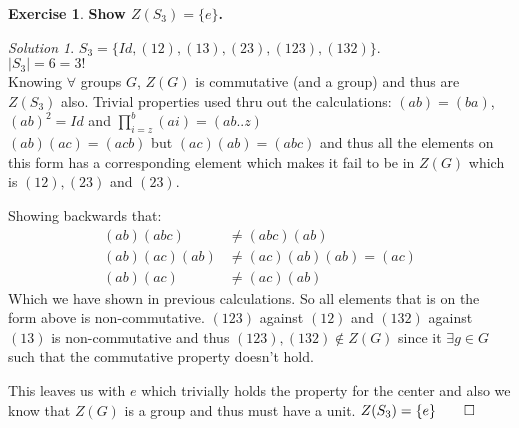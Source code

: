 \documentclass[a4paper,twoside=false,abstract=false,numbers=noenddot,
titlepage=false,headings=small,parskip=half,version=last]{scrartcl}
\theoremstyle{definition}
\newtheorem{exercise}{Exercise}
\theoremstyle{remark}
\newtheorem*{solution}{Solution}
\begin{document}
\begin{exercise}
{\bf
Show $Z(S_3)=\{e\}$.
}
\end{exercise}
\begin{solution}
$S_3=\{Id,(1 2),(1 3),(2 3),(1 2 3),(1 3 2)\}$. \\
$|S_3|=6=3!$\\

Knowing $\forall$ groups $G$, $Z(G)$ is commutative (and a group) and thus are $Z(S_3)$ also.
Trivial properties used thru out the calculations: $(a b)=(b a)$,$(a b)^2=Id$ and $\prod_{i=z}^b (a i)=(a b .. z)$ \\

$(a b)(a c)=(a c b)$ but $(a c)(a b)=(a b c)$ 
and thus all the elements on this form has a corresponding element 
which makes it fail to be in $Z(G)$ which is $(1 2),(2 3)$ and $(2 3)$.

Showing backwards that:
\begin{align*}
    (a b)(a b c) &\neq (a b c)(a b) \\
    (a b)(a c)(a b) &\neq (a c)(a b)(a b) = (a c) \\
    (a b)(a c) &\neq (a c)(a b)
\end{align*}
Which we have shown in previous calculations. So all elements that is on the form above is non-commutative.
$(1 2 3)$ against $(1 2)$ and $(1 3 2)$ against $(1 3)$ is non-commutative and thus $(1 2 3),(1 3 2) \notin Z(G)$ since it $\exists g \in G$ such that the commutative property doesn't hold.

This leaves us with $e$ which trivially holds the property for the center and also we know that $Z(G)$ is a group and thus must have a unit.
$Z(S_3)=\{e\} \qed$



\end{solution}


\end{document}
